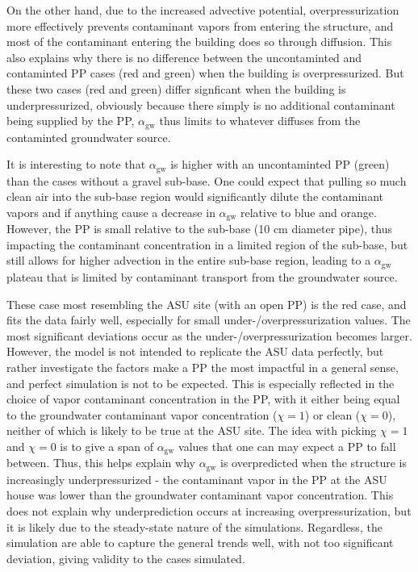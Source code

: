 \documentclass[journal=esthag,manuscript=article]{achemso}
\begin{document}
On the other hand, due to the increased advective potential, overpressurization more effectively prevents contaminant vapors from entering the structure, and most of the contaminant entering the building does so through diffusion.
This also explains why there is no difference between the uncontaminted and contaminted PP cases (red and green) when the building is overpressurized.
But these two cases (red and green) differ signficant when the building is underpressurized, obviously because there simply is no additional contaminant being supplied by the PP, $\alpha_\mathrm{gw}$ thus limits to whatever diffuses from the contaminted groundwater source.\par

It is interesting to note that $\alpha_\mathrm{gw}$ is higher with an uncontaminted PP (green) than the cases without a gravel sub-base.
One could expect that pulling so much clean air into the sub-base region would significantly dilute the contaminant vapors and if anything cause a decrease in $\alpha_\mathrm{gw}$ relative to blue and orange.
However, the PP is small relative to the sub-base (10 cm diameter pipe), thus impacting the contaminant concentration in a limited region of the sub-base, but still allows for higher advection in the entire sub-base region, leading to a $\alpha_\mathrm{gw}$ plateau that is limited by contaminant transport from the groundwater source.\par

These case most resembling the ASU site (with an open PP) is the red case, and fits the data fairly well, especially for small under-/overpressurization values.
The most significant deviations occur as the under-/overpressurization becomes larger.
However, the model is not intended to replicate the ASU data perfectly, but rather investigate the factors make a PP the most impactful in a general sense, and perfect simulation is not to be expected.
This is especially reflected in the choice of vapor contaminant concentration in the PP, with it either being equal to the groundwater contaminant vapor concentration ($\chi=1$) or clean ($\chi=0$), neither of which is likely to be true at the ASU site.
The idea with picking $\chi=1$ and $\chi=0$ is to give a span of $\alpha_\mathrm{gw}$ values that one can may expect a PP to fall between.
Thus, this helps explain why $\alpha_\mathrm{gw}$ is overpredicted when the structure is increasingly underpressurized - the contaminant vapor in the PP at the ASU house was lower than the groundwater contaminant vapor concentration.
This does not explain why underprediction occurs at increasing overpressurization, but it is likely due to the steady-state nature of the simulations.
Regardless, the simulation are able to capture the general trends well, with not too significant deviation, giving validity to the cases simulated.\par
\end{document}
